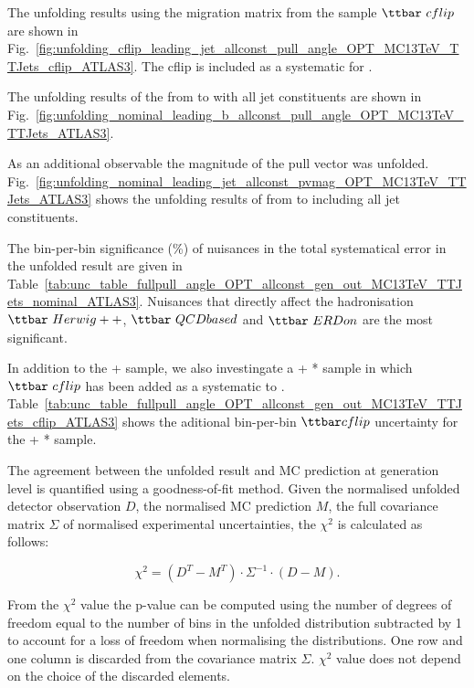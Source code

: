 The unfolding results using the migration matrix from the sample $\ttbar\ cflip$ are shown in Fig.~\ref{fig:unfolding_cflip_leading_jet_allconst_pull_angle_OPT_MC13TeV_TTJets_cflip_ATLAS3}. The \ttbar cflip is included as a systematic for \ttbar.

The unfolding results of the \pullangle from \leadingb to \scndleadingb with all jet constituents are shown in Fig.~\ref{fig:unfolding_nominal_leading_b_allconst_pull_angle_OPT_MC13TeV_TTJets_ATLAS3}.

As an additional observable the magnitude of the pull vector \pvmag was unfolded. Fig.~\ref{fig:unfolding_nominal_leading_jet_allconst_pvmag_OPT_MC13TeV_TTJets_ATLAS3} shows the unfolding results of \pvmag from \leadingjet to \scndleadingjet including all jet constituents.

The bin-per-bin significance (\%) of nuisances in the total systematical error in the unfolded result are given in Table~\ref{tab:unc_table_fullpull_angle_OPT_allconst_gen_out_MC13TeV_TTJets_nominal_ATLAS3}. Nuisances that directly affect the hadronisation $\ttbar\ Herwig++$, $\ttbar\ QCDbased$ and $\ttbar\ ERDon$ are the most significant.

In addition to the \POWHEG+ sample, we also investingate a \POWHEG+ * sample in which $\ttbar\ cflip$ has been added as a systematic to \ttbar. Table~\ref{tab:unc_table_fullpull_angle_OPT_allconst_gen_out_MC13TeV_TTJets_cflip_ATLAS3} shows the aditional bin-per-bin $\ttbar cflip$ uncertainty for the \POWHEG+ * sample.

The agreement between the unfolded result and MC prediction at generation level is quantified using a goodness-of-fit method. Given the normalised unfolded detector observation $D$, the normalised MC prediction $M$, the full covariance matrix $\Sigma$ of normalised experimental uncertainties, the $\chi^{2}$ is calculated as follows:

\begin{equation}
  \chi^{2}=(D^{T}-M^{T})\cdot\Sigma^{-1}\cdot(D-M).
  \label{eq:chi2}
\end{equation}

From the $\chi^{2}$ value the p-value can be computed using the number of degrees of freedom equal to the number of bins in the unfolded distribution subtracted by 1 to account for a loss of freedom when normalising the distributions. One row and one column is discarded from the covariance matrix $\Sigma$. $\chi^{2}$ value does not depend on the choice of the discarded elements.

